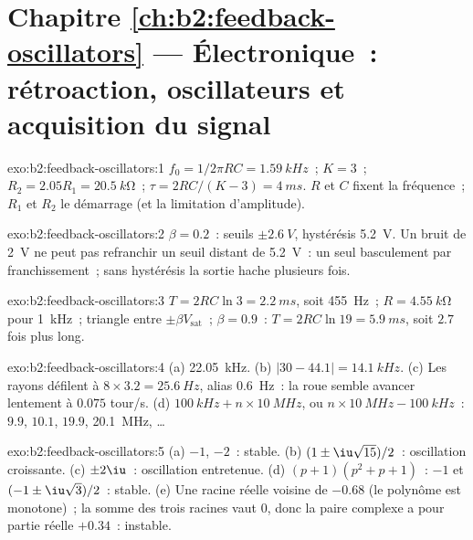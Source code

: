 \section*{Chapitre \ref{ch:b2:feedback-oscillators} --- Électronique~: rétroaction, oscillateurs et acquisition du signal}

\begin{solution}{exo:b2:feedback-oscillators:1}
$f_0 = 1/2\pi RC = \qty{1.59}{kHz}$~; $K = 3$~; $R_2 = 2.05R_1 = \qty{20.5}{k\ohm}$~;
$\tau = 2RC/(K - 3) = \qty{4}{ms}$. $R$ et $C$ fixent la fréquence~; $R_1$ et $R_2$ le
démarrage (et la limitation d'amplitude).
\end{solution}

\begin{solution}{exo:b2:feedback-oscillators:2}
$\beta = 0.2$~: seuils $\pm\qty{2.6}{V}$, hystérésis \qty{5.2}{V}. Un bruit de
\qty{2}{V} ne peut pas refranchir un seuil distant de \qty{5.2}{V}~: un seul basculement par
franchissement~; sans hystérésis la sortie hache plusieurs fois.
\end{solution}

\begin{solution}{exo:b2:feedback-oscillators:3}
$T = 2RC\ln3 = \qty{2.2}{ms}$, soit \qty{455}{Hz}~; $R = \qty{4.55}{k\ohm}$ pour \qty{1}{kHz}~;
triangle entre $\pm\beta V_{\text{sat}}$~; $\beta = 0.9$~: $T = 2RC\ln19 = \qty{5.9}{ms}$,
soit $2.7$ fois plus long.
\end{solution}

\begin{solution}{exo:b2:feedback-oscillators:4}
(a) \qty{22.05}{kHz}. (b) $|30 - 44.1| = \qty{14.1}{kHz}$. (c) Les rayons défilent à $8 \times 3.2 =
\qty{25.6}{Hz}$, alias \qty{0.6}{Hz}~: la roue semble avancer lentement à
$0.075$ tour/s. (d) $\qty{100}{kHz} + n \times \qty{10}{MHz}$, ou $n \times \qty{10}{MHz} -
\qty{100}{kHz}$~: $9.9$, $10.1$, $19.9$, \qty{20.1}{MHz}, \dots
\end{solution}

\begin{solution}{exo:b2:feedback-oscillators:5}
(a) $-1$, $-2$~: stable. (b) $(1 \pm \iu\sqrt{15})/2$~: oscillation croissante.
(c) $\pm2\iu$~: oscillation entretenue. (d) $(p + 1)(p^2 + p + 1)$~: $-1$ et
$(-1 \pm \iu\sqrt3)/2$~: stable. (e) Une racine réelle voisine de $-0.68$ (le
polynôme est monotone)~; la somme des trois racines vaut $0$, donc la
paire complexe a pour partie réelle $+0.34$~: instable.
\end{solution}

